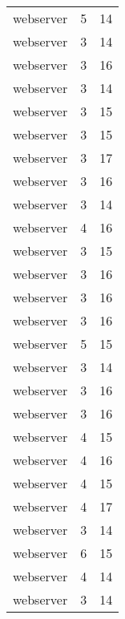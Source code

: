 \begin{table}
\begin{tabular}{lrr}
                       webserver &         5 &        14 \\
                       webserver &         3 &        14 \\
                       webserver &         3 &        16 \\
                       webserver &         3 &        14 \\
                       webserver &         3 &        15 \\
                       webserver &         3 &        15 \\
                       webserver &         3 &        17 \\
                       webserver &         3 &        16 \\
                       webserver &         3 &        14 \\
                       webserver &         4 &        16 \\
                       webserver &         3 &        15 \\
                       webserver &         3 &        16 \\
                       webserver &         3 &        16 \\
                       webserver &         3 &        16 \\
                       webserver &         5 &        15 \\
                       webserver &         3 &        14 \\
                       webserver &         3 &        16 \\
                       webserver &         3 &        16 \\
                       webserver &         4 &        15 \\
                       webserver &         4 &        16 \\
                       webserver &         4 &        15 \\
                       webserver &         4 &        17 \\
                       webserver &         3 &        14 \\
                       webserver &         6 &        15 \\
                       webserver &         4 &        14 \\
                       webserver &         3 &        14 \\

\end{tabular}
\end{table}
